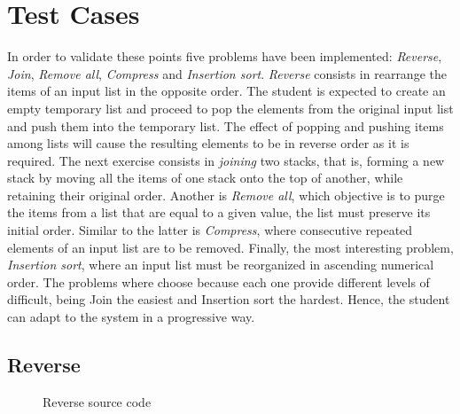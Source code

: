 
\section{Test Cases}\label{sec:testcases}

In order to validate these points five problems have been implemented:
\emph{Reverse}, \emph{Join}, \emph{Remove all}, \emph{Compress} and
\emph{Insertion sort}. \emph{Reverse} consists in rearrange the items
of an input list in the opposite order. The student is expected to
create an empty temporary list and proceed to pop the elements from
the original input list and push them into the temporary list. The
effect of popping and pushing items among lists will cause the
resulting elements to be in reverse order as it is required. The next
exercise consists in \emph{joining} two stacks, that is, forming a new
stack by moving all the items of one stack onto the top of another,
while retaining their original order. Another is \emph{Remove all},
which objective is to purge the items from a list that are equal to
a given value, the list must preserve its initial order. Similar to
the latter is \emph{Compress}, where consecutive repeated elements of
an input list are to be removed. Finally, the most interesting
problem, \emph{Insertion sort}, where an input list must be
reorganized in ascending numerical order. The problems where choose
because each one provide different levels of difficult, being Join the
easiest and Insertion sort the hardest. Hence, the student can adapt
to the system in a progressive way.

\newcommand\stepfig[5]{
  \subfigure[{\scriptsize\texttt{#1}} {\scriptsize(#2)}]
            {\texttt{[image: img/\#4/\#3/\#3\#5.png]}\label{fig:#3:#4:#5}}
}

\subsection{Reverse}

\renewcommand*\FancyVerbStartString{BEGIN-REV}
\renewcommand*\FancyVerbStopString{END-REV}
\begin{figure}[h!]
  \caption{Reverse source code}
  \label{fig:code:rev}
\end{figure}

